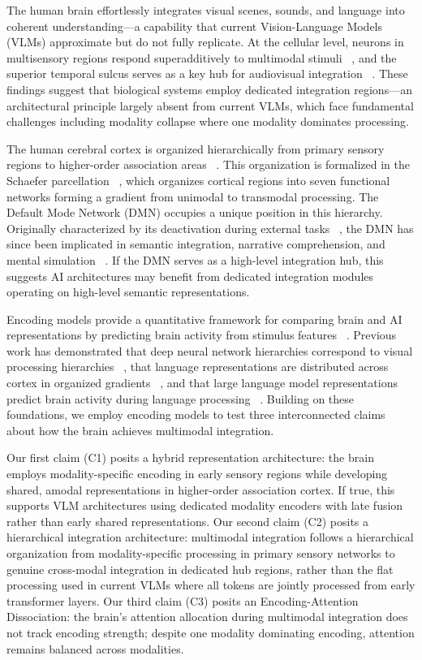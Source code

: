 \documentclass[10pt,letterpaper]{article}
\begin{document}
The human brain effortlessly integrates visual scenes, sounds, and language into coherent understanding—a capability that current Vision-Language Models (VLMs) approximate but do not fully replicate. At the cellular level, neurons in multisensory regions respond superadditively to multimodal stimuli ~\citep{stein1993merging}, and the superior temporal sulcus serves as a key hub for audiovisual integration ~\citep{beauchamp2004unraveling}. These findings suggest that biological systems employ dedicated integration regions—an architectural principle largely absent from current VLMs, which face fundamental challenges including modality collapse where one modality dominates processing.

The human cerebral cortex is organized hierarchically from primary sensory regions to higher-order association areas ~\citep{margulies2016situating}. This organization is formalized in the Schaefer parcellation ~\citep{schaefer2018local}, which organizes cortical regions into seven functional networks forming a gradient from unimodal to transmodal processing. The Default Mode Network (DMN) occupies a unique position in this hierarchy. Originally characterized by its deactivation during external tasks ~\citep{me2001default}, the DMN has since been implicated in semantic integration, narrative comprehension, and mental simulation ~\citep{mar2011neural,simony2016dynamic}. If the DMN serves as a high-level integration hub, this suggests AI architectures may benefit from dedicated integration modules operating on high-level semantic representations.

Encoding models provide a quantitative framework for comparing brain and AI representations by predicting brain activity from stimulus features ~\citep{naselaris2011encoding}. Previous work has demonstrated that deep neural network hierarchies correspond to visual processing hierarchies ~\citep{gucclu2015deep}, that language representations are distributed across cortex in organized gradients ~\citep{huth2016natural}, and that large language model representations predict brain activity during language processing ~\citep{caucheteux2022brains}. Building on these foundations, we employ encoding models to test three interconnected claims about how the brain achieves multimodal integration.

Our first claim (C1) posits a hybrid representation architecture: the brain employs modality-specific encoding in early sensory regions while developing shared, amodal representations in higher-order association cortex. If true, this supports VLM architectures using dedicated modality encoders with late fusion rather than early shared representations. Our second claim (C2) posits a hierarchical integration architecture: multimodal integration follows a hierarchical organization from modality-specific processing in primary sensory networks to genuine cross-modal integration in dedicated hub regions, rather than the flat processing used in current VLMs where all tokens are jointly processed from early transformer layers. Our third claim (C3) posits an Encoding-Attention Dissociation: the brain’s attention allocation during multimodal integration does not track encoding strength; despite one modality dominating encoding, attention remains balanced across modalities.
\end{document}
